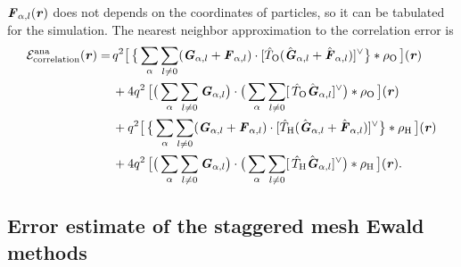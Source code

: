 \documentclass[aps,pre,preprint,unsortedaddress]{revtex4}
\renewcommand{\v}[1]{\textbf{\textit{#1}}}
\begin{document}
$\v F_{\alpha,l} (\v r)$ 
does not depends on the coordinates of particles,
so it can be tabulated  for the simulation.
The nearest neighbor approximation to the correlation error is
\begin{align}\nonumber
  \mathcal E^{\textrm{ana}}_{\textrm{correlation}}(\v r)
  =\,&
  q^2
  \big[\,
  \big\{
  \sum_{\alpha} \sum_{l\neq 0}
  (\v G_{\alpha,l}+\v F_{\alpha,l})\cdot
  [\hat T_{\textrm{O}} (\hat{\v G}_{\alpha,l}+\hat{\v F}_{\alpha,l})]^{\vee}
  \big\}
  \ast \rho_{\textrm{O}}
  \,\big] (\v r) \\\nonumber
  \,&+
  4q^2\,
  \big[
  \big(
  \sum_{\alpha} \sum_{l\neq 0}  
  \v G_{\alpha,l}
  \big)
  \cdot
  \big(
  \sum_{\alpha} \sum_{l\neq 0}  
  [\,\hat T_{\textrm{O}}\hat{\v G}_{\alpha,l}]^{\vee}
  \big)
  \ast \rho_{\textrm{O}}\,
  \big] (\v r) \\\nonumber
  \,&+
  q^2
  \big[\,
  \big\{
  \sum_{\alpha} \sum_{l\neq 0}
  (\v G_{\alpha,l}+\v F_{\alpha,l})\cdot
  [\hat T_{\textrm{H}} (\hat{\v G}_{\alpha,l}+\hat{\v F}_{\alpha,l})]^{\vee}
  \big\}
  \ast \rho_{\textrm{H}}
  \,\big] (\v r) \\
  \,&+
  4q^2\,
  \big[
  \big(
  \sum_{\alpha} \sum_{l\neq 0}  
  \v G_{\alpha,l}
  \big)
  \cdot
  \big(
  \sum_{\alpha} \sum_{l\neq 0}  
  [\,\hat T_{\textrm{H}}\hat{\v G}_{\alpha,l}]^{\vee}
  \big)
  \ast \rho_{\textrm{H}}\,
  \big] (\v r).
\end{align}



\subsection{Error estimate of the staggered mesh Ewald methods}
\end{document}
